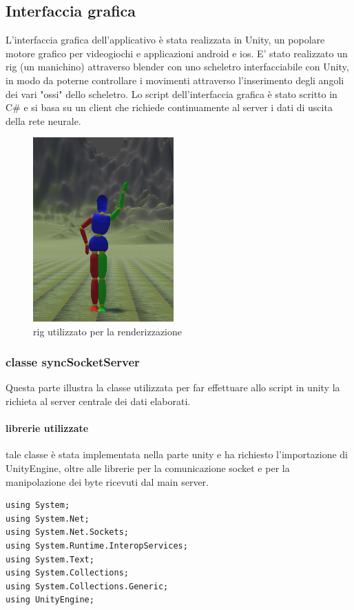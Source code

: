 \documentclass[10pt,a4paper]{article}
\begin{document}
\subsection{Interfaccia grafica}
L'interfaccia grafica dell'applicativo è stata realizzata in Unity, un popolare motore grafico per videogiochi e applicazioni android e ios.
E' stato realizzato un rig (un manichino) attraverso blender con uno scheletro interfacciabile con Unity, in modo da poterne controllare i movimenti attraverso l'inserimento degli angoli dei vari "ossi" dello scheletro.
Lo script dell'interfaccia grafica è stato scritto in C\# e si basa su un client che richiede continuamente al server i dati di uscita della rete neurale.


\begin{figure}[h!]
  	\centering
    \includegraphics[height=200pt]{dummy.PNG}
    \caption{rig utilizzato per la renderizzazione}
\end{figure}

\subsubsection{classe syncSocketServer}
Questa parte illustra la classe utilizzata per far effettuare allo script in unity la richieta al server centrale dei dati elaborati.

\paragraph{librerie utilizzate}
tale classe è stata implementata nella parte unity e ha richiesto l'importazione di UnityEngine, oltre alle librerie per la comunicazione socket e per la manipolazione dei byte ricevuti dal main server. 
\begin{lstlisting}[style=mycsharp, caption=librerie class client C\#, captionpos=b]
using System;
using System.Net;
using System.Net.Sockets;
using System.Runtime.InteropServices;
using System.Text;
using System.Collections;
using System.Collections.Generic;
using UnityEngine;

\end{lstlisting}
\end{document}
